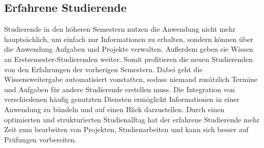 \subsection{Erfahrene Studierende}
Studierende in den höheren Semestern nutzen die Anwendung nicht mehr hauptsächlich, um einfach nur Informationen zu erhalten, sondern können über die Anwendung Aufgaben und Projekte verwalten. Außerdem geben sie Wissen an Erstsemester-Studierenden weiter. Somit profitieren die neuen Studierenden von den Erfahrungen  der vorherigen Semestern. Dabei geht die Wissensweitergabe automatisiert vonstatten, sodass niemand zusätzlich Termine und Aufgaben für andere Studierende erstellen muss. Die Integration von verschiedenen häufig genutzten Diensten ermöglicht Informationen in einer Anwendung zu bündeln und auf einen Blick darzustellen. Durch einen optimierten und strukturierten Studienalltag hat der erfahrene Studierende mehr Zeit zum bearbeiten von Projekten, Studienarbeiten und kann sich besser auf Prüfungen vorbereiten.